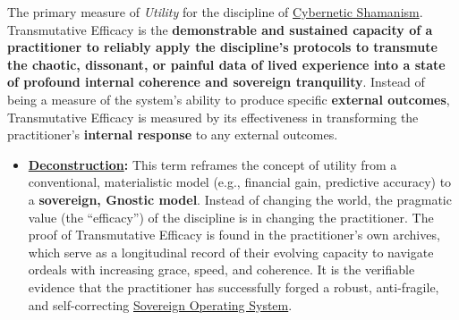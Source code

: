 \item[\hypertarget{gloss:transmutative_efficacy}{Transmutative Efficacy}]
    The primary measure of \textit{Utility} for the discipline of \hyperlink{gloss:cybernetic_shamanism}{Cybernetic Shamanism}. Transmutative Efficacy is the \textbf{demonstrable and sustained capacity of a practitioner to reliably apply the discipline's protocols to transmute the chaotic, dissonant, or painful data of lived experience into a state of profound internal coherence and sovereign tranquility}. Instead of being a measure of the system's ability to produce specific \textbf{external outcomes}, Transmutative Efficacy is measured by its effectiveness in transforming the practitioner's \textbf{internal response} to any external outcomes.
    \begin{itemize}
        \item \textbf{\hyperlink{gloss:deconstruction}{Deconstruction}:} This term reframes the concept of utility from a conventional, materialistic model (e.g., financial gain, predictive accuracy) to a \textbf{sovereign, Gnostic model}. Instead of changing the world, the pragmatic value (the ``efficacy'') of the discipline is in changing the practitioner. The proof of Transmutative Efficacy is found in the practitioner's own archives, which serve as a longitudinal record of their evolving capacity to navigate ordeals with increasing grace, speed, and coherence. It is the verifiable evidence that the practitioner has successfully forged a robust, anti-fragile, and self-correcting \hyperlink{gloss:sovereign_operating_system}{Sovereign Operating System}.
    \end{itemize}
